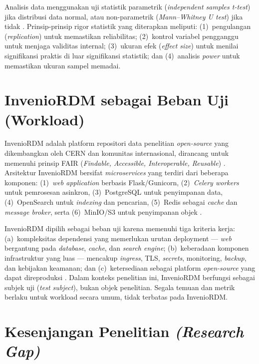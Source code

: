 Analisis data menggunakan uji statistik parametrik (\textit{independent samples t-test}) jika distribusi data normal, atau non-parametrik (\textit{Mann--Whitney U test}) jika tidak \citep{wohlin2012experimentation}. Prinsip-prinsip rigor statistik yang diterapkan meliputi: (1)~pengulangan (\textit{replication}) untuk memastikan reliabilitas; (2)~kontrol variabel pengganggu untuk menjaga validitas internal; (3)~ukuran efek (\textit{effect size}) untuk menilai signifikansi praktis di luar signifikansi statistik; dan (4)~analisis \textit{power} untuk memastikan ukuran sampel memadai.

\section{InvenioRDM sebagai Beban Uji (Workload)}

InvenioRDM adalah platform repositori data penelitian \textit{open-source} yang dikembangkan oleh CERN dan komunitas internasional, dirancang untuk memenuhi prinsip FAIR (\textit{Findable, Accessible, Interoperable, Reusable}) \citep{invenio2024}. Arsitektur InvenioRDM bersifat \textit{microservices} yang terdiri dari beberapa komponen: (1)~\textit{web application} berbasis Flask/Gunicorn, (2)~\textit{Celery workers} untuk pemrosesan asinkron, (3)~PostgreSQL untuk penyimpanan data, (4)~OpenSearch untuk \textit{indexing} dan pencarian, (5)~Redis sebagai \textit{cache} dan \textit{message broker}, serta (6)~MinIO/S3 untuk penyimpanan objek \citep{przerwa2025modern}.

InvenioRDM dipilih sebagai beban uji karena memenuhi tiga kriteria kerja: (a)~kompleksitas dependensi yang memerlukan urutan deployment --- \textit{web} bergantung pada \textit{database}, \textit{cache}, dan \textit{search engine}; (b)~keberadaan komponen infrastruktur yang luas --- mencakup \textit{ingress}, TLS, \textit{secrets}, monitoring, \textit{backup}, dan kebijakan keamanan; dan (c)~ketersediaan sebagai platform \textit{open-source} yang dapat direproduksi \citep{chelakis2022creating, simko2016cern}. Dalam konteks penelitian ini, InvenioRDM berfungsi sebagai subjek uji (\textit{test subject}), bukan objek penelitian. Segala temuan dan metrik berlaku untuk workload secara umum, tidak terbatas pada InvenioRDM.

\section{Kesenjangan Penelitian \textit{(Research Gap)}}

